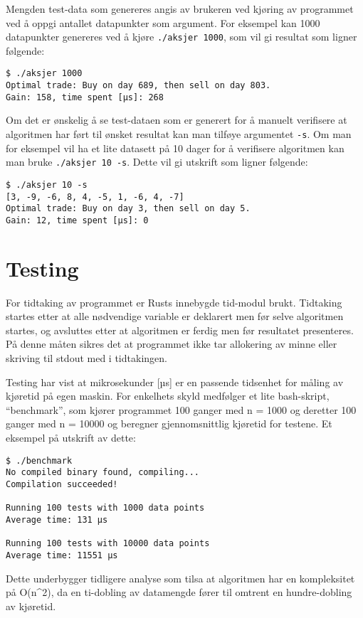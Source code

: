 Mengden test-data som genereres angis av brukeren ved kjøring av
programmet ved å oppgi antallet datapunkter som argument. For eksempel
kan 1000 datapunkter genereres ved å kjøre \texttt{./aksjer\ 1000}, som
vil gi resultat som ligner følgende:

\begin{verbatim}
$ ./aksjer 1000
Optimal trade: Buy on day 689, then sell on day 803.
Gain: 158, time spent [µs]: 268
\end{verbatim}

Om det er ønskelig å se test-dataen som er generert for å manuelt
verifisere at algoritmen har ført til ønsket resultat kan man tilføye
argumentet \texttt{-s}. Om man for eksempel vil ha et lite datasett på
10 dager for å verifisere algoritmen kan man bruke
\texttt{./aksjer\ 10\ -s}. Dette vil gi utskrift som ligner følgende:

\begin{verbatim}
$ ./aksjer 10 -s
[3, -9, -6, 8, 4, -5, 1, -6, 4, -7]
Optimal trade: Buy on day 3, then sell on day 5.
Gain: 12, time spent [µs]: 0
\end{verbatim}

\hypertarget{testing}{%
\section{Testing}\label{testing}}

For tidtaking av programmet er Rusts innebygde tid-modul brukt.
Tidtaking startes etter at alle nødvendige variable er deklarert men før
selve algoritmen startes, og avsluttes etter at algoritmen er ferdig men
før resultatet presenteres. På denne måten sikres det at programmet ikke
tar allokering av minne eller skriving til stdout med i tidtakingen.

Testing har vist at mikrosekunder {[}µs{]} er en passende tidsenhet for
måling av kjøretid på egen maskin. For enkelhets skyld medfølger et lite
bash-skript, ``benchmark'', som kjører programmet 100 ganger med n =
1000 og deretter 100 ganger med n = 10000 og beregner gjennomsnittlig
kjøretid for testene. Et eksempel på utskrift av dette:

\begin{verbatim}
$ ./benchmark
No compiled binary found, compiling...
Compilation succeeded!

Running 100 tests with 1000 data points
Average time: 131 µs

Running 100 tests with 10000 data points
Average time: 11551 µs
\end{verbatim}

Dette underbygger tidligere analyse som tilsa at algoritmen har en
kompleksitet på O(n\^{}2), da en ti-dobling av datamengde fører til
omtrent en hundre-dobling av kjøretid.
